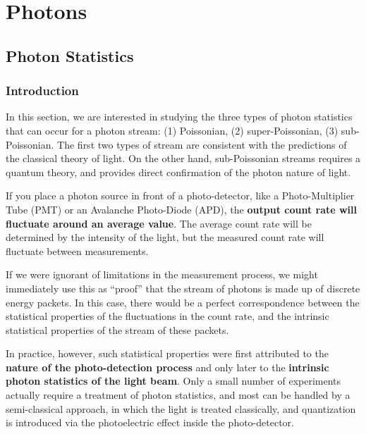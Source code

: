 \documentclass[12pt,a4paper]{report}
\begin{document}

\chapter{Photons}

\section{Photon Statistics}

\subsection{Introduction}

In this section, we are interested in studying the three types of photon statistics that can occur for a photon stream: (1) Poissonian, (2) super-Poissonian, (3) sub-Poissonian. The first two types of stream are consistent with the predictions of the classical theory of light. On the other hand, sub-Poissonian streams requires a quantum theory, and provides direct confirmation of the photon nature of light.

If you place a photon source in front of a photo-detector, like a Photo-Multiplier Tube (PMT) or an Avalanche Photo-Diode (APD), the \textbf{output count rate will fluctuate around an average value}. The average count rate will be determined by the intensity of the light, but the measured count rate will fluctuate between measurements.

If we were ignorant of limitations in the measurement process, we might immediately use this as ``proof'' that the stream of photons is made up of discrete energy packets. In this case, there would be a perfect correspondence between the statistical properties of the fluctuations in the count rate, and the intrinsic statistical properties of the stream of these packets.

In practice, however, such statistical properties were first attributed to the \textbf{nature of the photo-detection process} and only later to the \textbf{intrinsic photon statistics of the light beam}. Only a small number of experiments actually require a treatment of photon statistics, and most can be handled by a semi-classical approach, in which the light is treated classically, and quantization is introduced via the photoelectric effect inside the photo-detector.
\end{document}
